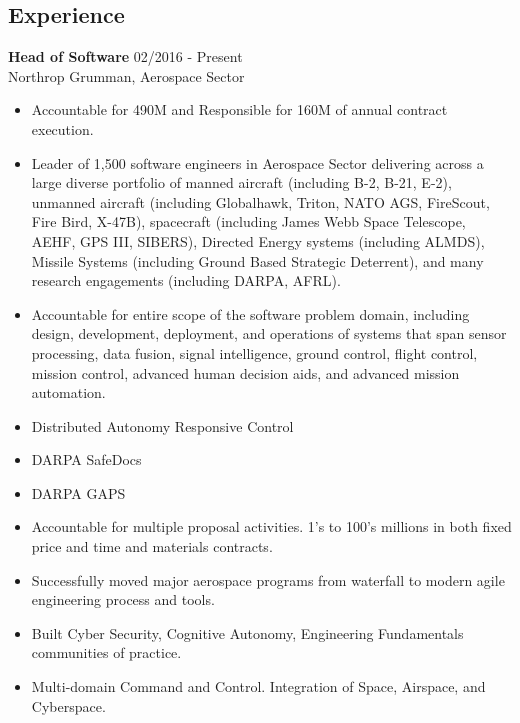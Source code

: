 \begin{resume} 
 

\section{Experience}
 {\bf Head of Software} \hfill 02/2016 - Present\\
 Northrop Grumman, Aerospace Sector\\
 \begin{itemize} \itemsep -2pt 
 \item Accountable for 490M and Responsible for 160M of annual contract execution.
 \item Leader of 1,500 software engineers in Aerospace Sector delivering across a large diverse portfolio of manned aircraft (including B-2, B-21, E-2), unmanned aircraft (including Globalhawk, Triton, NATO AGS, FireScout, Fire Bird, X-47B), spacecraft (including James Webb Space Telescope, AEHF, GPS III, SIBERS), Directed Energy systems (including ALMDS), Missile Systems (including Ground Based Strategic Deterrent), and many research engagements (including DARPA, AFRL).
 \item Accountable for entire scope of the software problem domain, including design, development, deployment, and operations of systems that span sensor processing, data fusion, signal intelligence, ground control, flight control, mission control, advanced human decision aids, and advanced mission automation.
 \item Distributed Autonomy Responsive Control
 \item DARPA SafeDocs
 \item DARPA GAPS
 \item Accountable for multiple proposal activities. 1's to 100's millions in both fixed price and time and materials contracts.
 \item Successfully moved major aerospace programs from waterfall to modern agile engineering process and tools.
 \item Built Cyber Security, Cognitive Autonomy, Engineering Fundamentals communities of practice.
 \item Multi-domain Command and Control. Integration of Space, Airspace, and Cyberspace.
 \end{itemize}


\end{resume}
